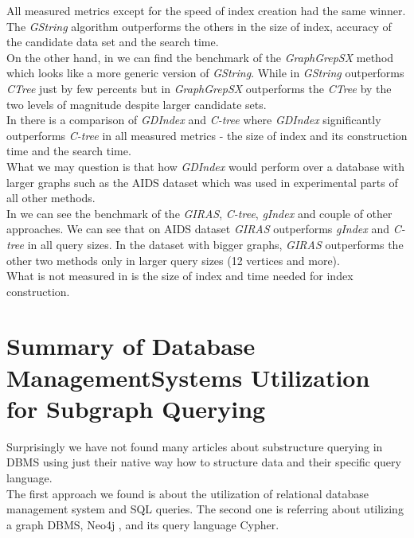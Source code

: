 All measured metrics except for the speed of index creation had the same winner. The \textit{GString} algorithm outperforms the others in the size of index, accuracy of the candidate data set and the search time.\\

On the other hand, in \cite{GraphGrepSX} we can find the benchmark of the \textit{GraphGrepSX} method which looks like a more generic version of \textit{GString}. While in \cite{GString} \textit{GString} outperforms \textit{CTree} just by few percents but in \cite{GraphGrepSX}  \textit{GraphGrepSX} outperforms the \textit{CTree} by the two levels of magnitude despite larger candidate sets.\\

In \cite{GDIndex} there is a comparison of \textit{GDIndex} and \textit{C-tree} where \textit{GDIndex} significantly outperforms \textit{C-tree} in all measured metrics - the size of index and its construction time and the search time.\\

What we may question is that how \textit{GDIndex} would perform over a database with larger graphs such as the AIDS dataset which was used in experimental parts of all other methods.\\

In \cite{GIRAS} we can see the benchmark of the \textit{GIRAS}, \textit{C-tree}, \textit{gIndex} and couple of other approaches. We can see that on AIDS dataset \textit{GIRAS} outperforms \textit{gIndex} and \textit{C-tree} in all query sizes. In the dataset with bigger graphs, \textit{GIRAS} outperforms the other two methods only in larger query sizes (12 vertices and more).\\

What is not measured in \cite{GIRAS} is the size of index and time needed for index construction.

\section{Summary of Database Management\break Systems Utilization for Subgraph Querying}

Surprisingly we have not found many articles about substructure querying in DBMS using just their native way how to structure data and their specific query language.\\

The first approach \cite{SQL} we found is about the utilization of relational database management system and SQL queries. The second one \cite{Hoksza} is referring about utilizing a graph DBMS, Neo4j \cite{Neo4J}, and its query language Cypher.

